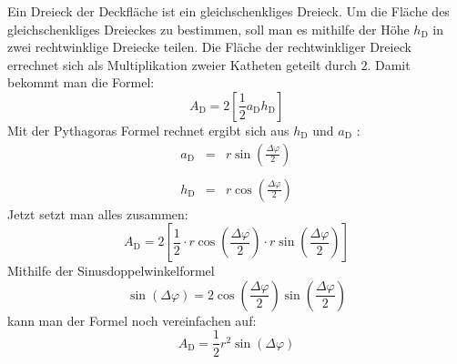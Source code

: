 \documentclass[Protokollheft.tex]{subfiles}
\begin{document}
	\noindent
	Ein Dreieck der Deckfläche ist ein gleichschenkliges Dreieck. Um die Fläche des gleichschenkliges Dreieckes zu bestimmen, soll man es mithilfe der Höhe  $h_\text{D}$ in zwei rechtwinklige Dreiecke teilen. Die Fläche der rechtwinkliger Dreieck errechnet sich als Multiplikation zweier Katheten geteilt durch $2$. Damit bekommt man die Formel: 
	$$ A_\text{D} = 2 \left[\frac12 a_\text{D} h_\text{D}\right]$$
	Mit der Pythagoras Formel rechnet ergibt sich aus $h_\text{D}$ und $a_\text{D}$ :
	\begin{eqnarray*}
		a_\text{D}&=&r \sin\left(\frac{\Delta \varphi}{2}\right)\\
		\\
		h_\text{D}&=&r \cos\left(\frac{\Delta \varphi}{2}\right)
	\end{eqnarray*}
	Jetzt setzt man alles zusammen:
	$$A_\text{D} = 2 \left[ \frac12 \cdot r \cos\left(\frac{\Delta \varphi}{2}\right)\cdot r \sin\left(\frac{\Delta \varphi}{2}\right)  \right]$$
	Mithilfe der Sinusdoppelwinkelformel
	$$  \sin(\Delta\varphi)=2 \cos\left(\frac{\Delta \varphi}{2}\right) \sin\left(\frac{\Delta \varphi}{2}\right)  $$
	kann man der Formel noch vereinfachen auf:
	$$A_\text{D} =  \frac12 r^2 \sin(\Delta\varphi)$$
	
\end{document}
